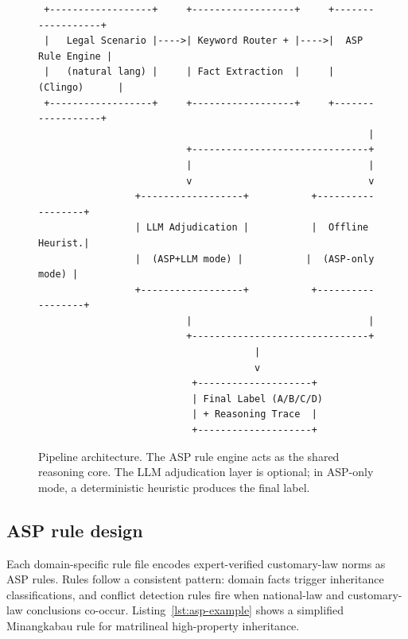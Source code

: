 \documentclass[pdflatex,sn-basic,Numbered]{sn-jnl}
\begin{document}
\begin{figure}[t]
\centering
\small
\begin{verbatim}
 +------------------+     +------------------+     +------------------+
 |   Legal Scenario |---->| Keyword Router + |---->|  ASP Rule Engine |
 |   (natural lang) |     | Fact Extraction  |     |    (Clingo)      |
 +------------------+     +------------------+     +------------------+
                                                          |
                          +-------------------------------+
                          |                               |
                          v                               v
                 +------------------+           +------------------+
                 | LLM Adjudication |           |  Offline Heurist.|
                 |  (ASP+LLM mode) |           |  (ASP-only mode) |
                 +------------------+           +------------------+
                          |                               |
                          +-------------------------------+
                                      |
                                      v
                           +--------------------+
                           | Final Label (A/B/C/D)
                           | + Reasoning Trace  |
                           +--------------------+
\end{verbatim}
\caption{Pipeline architecture. The ASP rule engine acts as the shared reasoning core. The LLM adjudication layer is optional; in ASP-only mode, a deterministic heuristic produces the final label.}\label{fig:architecture}
\end{figure}

\subsection{ASP rule design}\label{subsec:asp-rules}

Each domain-specific rule file encodes expert-verified customary-law norms as ASP rules.
Rules follow a consistent pattern: domain facts trigger inheritance classifications, and conflict detection rules fire when national-law and customary-law conclusions co-occur.
Listing~\ref{lst:asp-example} shows a simplified Minangkabau rule for matrilineal high-property inheritance.
\end{document}
